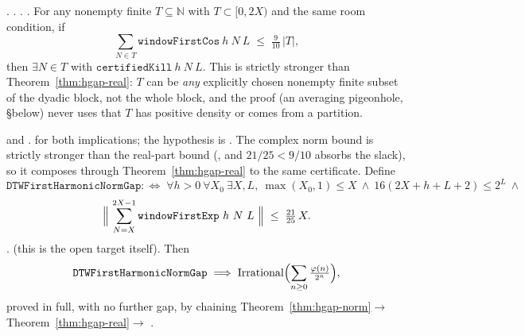 \begin{thm}
\label{thm:hgap-subset}
.
. . .
For any nonempty finite $T\subseteq\mathbb N$ with $T\subset[0,2X)$ and the same room condition, if
\[
  \sum_{N\in T} \mathtt{windowFirstCos}\ h\ N\ L \;\le\; \tfrac{9}{10}\,|T| ,
\]
then $\exists N\in T$ with $\mathtt{certifiedKill}\ h\ N\ L$. This is strictly stronger than
Theorem~\ref{thm:hgap-real}: $T$ can be \emph{any} explicitly chosen nonempty finite subset of the
dyadic block, not the whole block, and the proof (an averaging pigeonhole, \S below) never uses
that $T$ has positive density or comes from a partition.
\end{thm}

\begin{thm}
\label{thm:hgap-norm}
 and
.
 for both implications; the hypothesis  is .
The complex norm bound is strictly stronger than the real-part bound
(, and $21/25 < 9/10$ absorbs the slack), so it composes through
Theorem~\ref{thm:hgap-real} to the same certificate. Define
\[
  \mathtt{DTWFirstHarmonicNormGap} :\Leftrightarrow\;
  \forall h{>}0\ \forall X_0\ \exists X, L,\ \max(X_0,1)\le X\ \wedge\ 16(2X{+}h{+}L{+}2)\le 2^L\ \wedge
\]
\[
  \Bigl\|\ \sum_{N=X}^{2X-1}\mathtt{windowFirstExp}\ h\ N\ L\ \Bigr\| \;\le\; \tfrac{21}{25}\,X .
\]
.  (this is the open target itself). Then
\[
  \mathtt{DTWFirstHarmonicNormGap} \;\Longrightarrow\; \mathrm{Irrational}\Bigl(\sum_{n\ge 0}
  \tfrac{\varphi(n)}{2^n}\Bigr),
\]
proved in full, with no further gap, by chaining
Theorem~\ref{thm:hgap-norm}$\to$Theorem~\ref{thm:hgap-real}$\to$
.
\end{thm}

